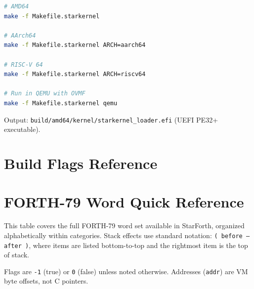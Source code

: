 \begin{lstlisting}[language=bash]
# AMD64
make -f Makefile.starkernel

# AArch64
make -f Makefile.starkernel ARCH=aarch64

# RISC-V 64
make -f Makefile.starkernel ARCH=riscv64

# Run in QEMU with OVMF
make -f Makefile.starkernel qemu
\end{lstlisting}

Output: \texttt{build/amd64/kernel/starkernel\_loader.efi} (UEFI PE32+ executable).


\appendix

\chapter{Build Flags Reference}


\chapter{FORTH-79 Word Quick Reference}
\label{app:word-ref}

This table covers the full FORTH-79 word set available in StarForth, organized
alphabetically within categories. Stack effects use standard notation:
\texttt{( before -- after )}, where items are listed bottom-to-top and the
rightmost item is the top of stack.

Flags are \texttt{-1} (true) or \texttt{0} (false) unless noted otherwise.
Addresses (\texttt{addr}) are VM byte offsets, not C pointers.

